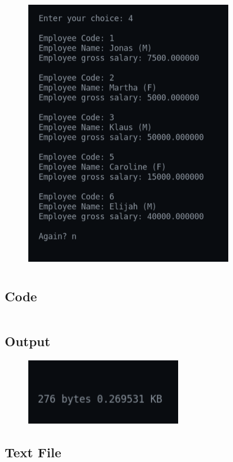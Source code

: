 \documentclass[12pt]{article}
\begin{document}
\newpage
\begin{figure}[h]
    \centering
    \includegraphics[width=0.8\textwidth]{7c.png}
\end{figure}

\newpage
\section{}
\subsection{Code}
\inputminted{c}{q8.c}
\subsection{Output}
\begin{figure}[h]
    \centering
    \includegraphics[width=0.6\textwidth]{8.png}
\end{figure}
\subsection{Text File}
\inputminted{c}{TRIAL.TXT}
\newpage
\end{document}
